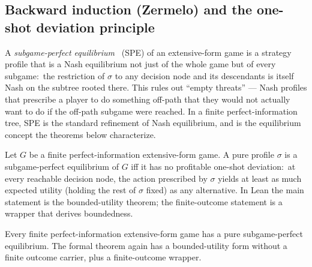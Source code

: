 
\subsection{Backward induction (Zermelo) and the one-shot deviation principle}
\label{sec:theorems:zermelo-odp}

A \emph{subgame-perfect equilibrium}~\citep{Selten1965} (SPE) of
an extensive-form game is a strategy profile that is a Nash
equilibrium not just of the whole game but of every subgame:\ the
restriction of $\sigma$ to any decision node and its descendants
is itself Nash on the subtree rooted there.  This rules out
``empty threats''  — Nash profiles that prescribe a player to do
something off-path that they would not actually want to do if the
off-path subgame were reached.  In a finite perfect-information
tree, SPE is the standard refinement of Nash equilibrium, and is
the equilibrium concept the theorems below characterize.

\begin{theorem}
\label{thm:odp}
Let $G$ be a finite perfect-information extensive-form game.  A pure
profile $\sigma$ is a subgame-perfect equilibrium of $G$ iff it has
no profitable one-shot deviation:\ at every reachable decision node,
the action prescribed by $\sigma$ yields at least as much expected
utility (holding the rest of $\sigma$ fixed) as any alternative.
In Lean the main statement is the bounded-utility theorem; the
finite-outcome statement is a wrapper that derives boundedness.
\end{theorem}

\begin{theorem}
\label{thm:zermelo}
Every finite perfect-information extensive-form game has a pure
subgame-perfect equilibrium.
The formal theorem again has a bounded-utility form without a finite
outcome carrier, plus a finite-outcome wrapper.
\end{theorem}

